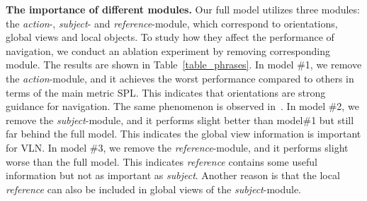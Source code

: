 \documentclass[sigconf]{acmart}
\begin{document}
\noindent\textbf{The importance of different modules.} Our full model utilizes three modules: the \textit{action}-, \textit{subject}- and \textit{reference}-module, which correspond to  orientations, global views and local objects. 
To study how they affect the performance of navigation, we conduct an ablation experiment by removing corresponding module. The results are shown in Table~\ref{table_phrases}.  
In model \#1, we remove the \textit{action}-module, and it achieves the worst performance compared to others in terms of the main metric SPL. This indicates that orientations are strong guidance for navigation. The same phenomenon is observed in~\cite{hu2019looking,qi2020oaam}. 
In model \#2, we remove  the \textit{subject}-module, and it performs slight better than model\#1 but still far behind the full model. This indicates the global view information is important for VLN.
In model \#3, we remove the \textit{reference}-module, and it performs slight worse than the full model.  This indicates \textit{reference} contains some useful information but not as important as \textit{subject}.
Another reason is that the local \textit{reference} can also be included in global views of the \textit{subject}-module.
\begin{table}[!htbp]
	\caption{Ablation experiment about importance of different modules.}
	\label{table_phrases}
	\vspace{-3mm}
	\centering
\end{table}
\end{document}

